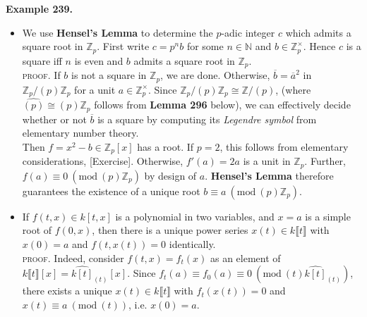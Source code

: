\documentclass[12pt,a4paper,footinclude=true,headinclude=true]{scrbook} %
\newenvironment{example}[2][Example]
    { \begin{mdframed}[backgroundcolor=gray!20] \textbf{#1 #2.} }
    {  \end{mdframed}}
\begin{document}
\begin{example}{239}
    \begin{itemize}
        \item[(a)] We use \textbf{Hensel's Lemma} to determine the $p$-adic integer $c$ which admits a square root in $\mathbb{Z}_p$. First write $c=p^nb$ for some $n\in\mathbb{N}$ and $b\in\mathbb{Z}_p^\times$. Hence $c$ is a square iff $n$ is even and $b$ admits a square root in $\mathbb{Z}_p$. \\
        \textsc{proof.} If $b$ is not a square in $\mathbb{Z}_p$, we are done. Otherwise, $\overline{b}=\overline{a}^2$ in $\mathbb{Z}_p/(p)\mathbb{Z}_p$ for a unit $a\in\mathbb{Z}_p^\times$. Since $\mathbb{Z}_p/(p)\mathbb{Z}_p\cong\mathbb{Z}/(p)$, (where $\widehat{(p)}\cong(p)\mathbb{Z}_p$ follows from \textbf{Lemma 296} below), we can effectively decide whether or not $\overline{b}$ is a square by computing its \textit{Legendre symbol} from elementary number theory.\\
        Then $f=x^2-b\in\mathbb{Z}_p[x]$ has a root. If $p=2$, this follows from elementary considerations, [Exercise]. Otherwise, $f'(a)=2a$ is a unit in $\mathbb{Z}_p$. Further, $f(a)\equiv0\ (\mathrm{mod}\ (p)\mathbb{Z}_p)$ by design of $a$. \textbf{Hensel's Lemma} therefore guarantees the existence of a unique root $b\equiv a\ (\mathrm{mod}\ (p)\mathbb{Z}_p)$.
        \item[(b)] If $f(t,x)\in k[t,x]$ is a polynomial in two variables, and $x=a$ is a simple root of $f(0,x)$, then there is a unique power series $x(t)\in k\llbracket t\rrbracket$ with $x(0)=a$ and $f(t,x(t))=0$ identically.\\
        \textsc{proof.} Indeed, consider $f(t,x)=f_t(x)$ as an element of $k\llbracket t\rrbracket[x]=\widehat{k[t]}_{(t)}[x]$. Since $f_t(a)\equiv f_0(a)\equiv0\ (\mathrm{mod}\ (t)\widehat{k[t]}_{(t)})$, there exists a unique $x(t)\in k\llbracket t\rrbracket$ with $f_t(x(t))=0$ and $x(t)\equiv a\ (\mathrm{mod}\ (t))$, i.e. $x(0)=a$.
    \end{itemize}
\end{example}
\end{document}
